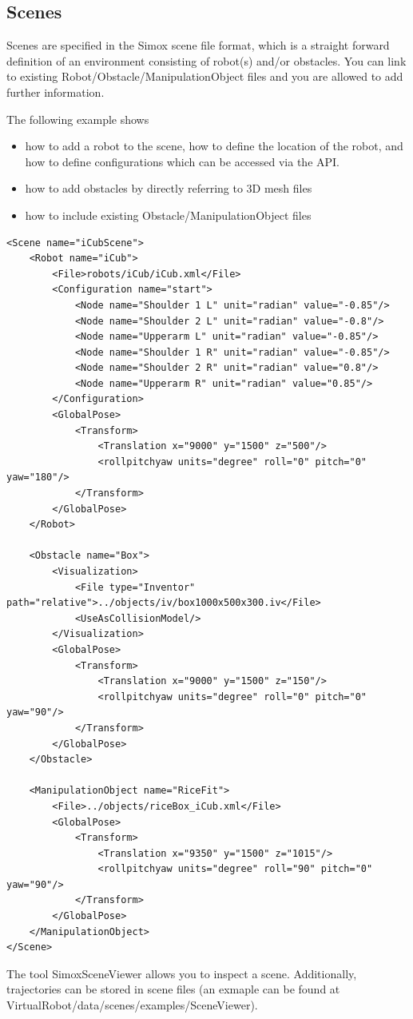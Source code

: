 \documentclass{book}
\begin{document}
\subsection{Scenes}
Scenes are specified in the Simox scene file format, which is a straight forward definition of an environment consisting of robot(s) and/or obstacles. You can link to existing Robot/Obstacle/ManipulationObject files and you are allowed to add further information.
\par
The following example shows 
\begin{itemize}
\item how to add a robot to the scene, how to define the location of the robot, and how to define configurations which can be accessed via the API.
\item how to add obstacles by directly referring to 3D mesh files
\item how to include existing Obstacle/ManipulationObject files
\end{itemize}
\begin{lstlisting}
<Scene name="iCubScene">
    <Robot name="iCub">
        <File>robots/iCub/iCub.xml</File>
        <Configuration name="start">
            <Node name="Shoulder 1 L" unit="radian" value="-0.85"/>
            <Node name="Shoulder 2 L" unit="radian" value="-0.8"/>
            <Node name="Upperarm L" unit="radian" value="-0.85"/>
            <Node name="Shoulder 1 R" unit="radian" value="-0.85"/>
            <Node name="Shoulder 2 R" unit="radian" value="0.8"/>
            <Node name="Upperarm R" unit="radian" value="0.85"/>
        </Configuration>
        <GlobalPose>
            <Transform>
                <Translation x="9000" y="1500" z="500"/>
                <rollpitchyaw units="degree" roll="0" pitch="0" yaw="180"/>
            </Transform>
        </GlobalPose>
    </Robot>

    <Obstacle name="Box">
        <Visualization>
            <File type="Inventor" path="relative">../objects/iv/box1000x500x300.iv</File>
            <UseAsCollisionModel/>
        </Visualization>
        <GlobalPose>
            <Transform>
                <Translation x="9000" y="1500" z="150"/>
                <rollpitchyaw units="degree" roll="0" pitch="0" yaw="90"/>
            </Transform>
        </GlobalPose>
    </Obstacle>

    <ManipulationObject name="RiceFit">
        <File>../objects/riceBox_iCub.xml</File>
        <GlobalPose>
            <Transform>
                <Translation x="9350" y="1500" z="1015"/>
                <rollpitchyaw units="degree" roll="90" pitch="0" yaw="90"/>
            </Transform>
        </GlobalPose>
    </ManipulationObject>
</Scene>
\end{lstlisting}
The tool SimoxSceneViewer allows you to inspect a scene. Additionally, trajectories can be stored in scene files (an exmaple can be found at VirtualRobot/data/scenes/examples/SceneViewer).
\end{document}
